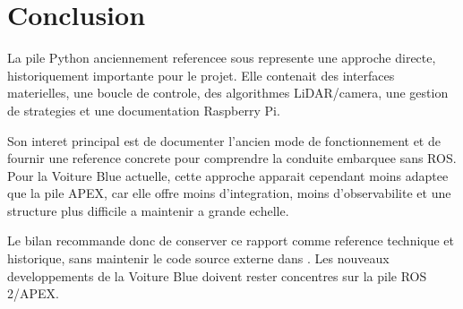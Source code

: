 \section{Conclusion}

La pile Python anciennement referencee sous  represente une approche directe, historiquement importante pour le projet. Elle contenait des interfaces materielles, une boucle de controle, des algorithmes LiDAR/camera, une gestion de strategies et une documentation Raspberry Pi.

Son interet principal est de documenter l'ancien mode de fonctionnement et de fournir une reference concrete pour comprendre la conduite embarquee sans ROS. Pour la Voiture Blue actuelle, cette approche apparait cependant moins adaptee que la pile APEX, car elle offre moins d'integration, moins d'observabilite et une structure plus difficile a maintenir a grande echelle.

Le bilan recommande donc de conserver ce rapport comme reference technique et historique, sans maintenir le code source externe dans . Les nouveaux developpements de la Voiture Blue doivent rester concentres sur la pile ROS 2/APEX.
